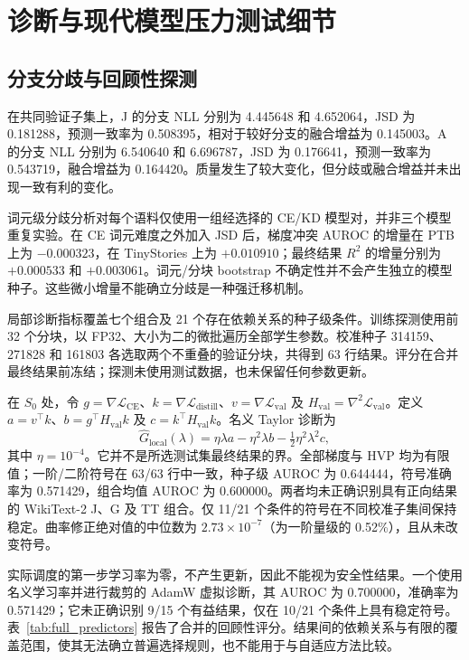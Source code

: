 \section{诊断与现代模型压力测试细节}\label{app:diagnostics-modern}

\subsection{分支分歧与回顾性探测}
在共同验证子集上，J 的分支 NLL 分别为 4.445648 和 4.652064，JSD 为 0.181288，预测一致率为 0.508395，相对于较好分支的融合增益为 0.145003。A 的分支 NLL 分别为 6.540640 和 6.696787，JSD 为 0.176641，预测一致率为 0.543719，融合增益为 0.164420。质量发生了较大变化，但分歧或融合增益并未出现一致有利的变化。

词元级分歧分析对每个语料仅使用一组经选择的 CE/KD 模型对，并非三个模型重复实验。在 CE 词元难度之外加入 JSD 后，梯度冲突 AUROC 的增量在 PTB 上为 $-0.000323$，在 TinyStories 上为 $+0.010910$；最终结果 $R^2$ 的增量分别为 $+0.000533$ 和 $+0.003061$。词元/分块 bootstrap 不确定性并不会产生独立的模型种子。这些微小增量不能确立分歧是一种强迁移机制。

局部诊断指标覆盖七个组合及 21 个存在依赖关系的种子级条件。训练探测使用前 32 个分块，以 FP32、大小为二的微批遍历全部学生参数。校准种子 314159、271828 和 161803 各选取两个不重叠的验证分块，共得到 63 行结果。评分在合并最终结果前冻结；探测未使用测试数据，也未保留任何参数更新。

在 $S_0$ 处，令 $g=\nabla\mathcal L_{\mathrm{CE}}$、$k=\nabla\mathcal L_{\mathrm{distill}}$、$v=\nabla\mathcal L_{\mathrm{val}}$ 及 $H_{\mathrm{val}}=\nabla^2\mathcal L_{\mathrm{val}}$。定义 $a=v^\top k$、$b=g^\top H_{\mathrm{val}}k$ 及 $c=k^\top H_{\mathrm{val}}k$。名义 Taylor 诊断为
\begin{equation}
\widehat G_{\mathrm{local}}(\lambda)=\eta\lambda a-\eta^2\lambda b-\tfrac12\eta^2\lambda^2c,
\end{equation}
其中 $\eta=10^{-4}$。它并不是所选测试集最终结果的界。全部梯度与 HVP 均为有限值；一阶/二阶符号在 63/63 行中一致，种子级 AUROC 为 0.644444，符号准确率为 0.571429，组合均值 AUROC 为 0.600000。两者均未正确识别具有正向结果的 WikiText-2 J、G 及 TT 组合。仅 11/21 个条件的符号在不同校准子集间保持稳定。曲率修正绝对值的中位数为 $2.73\times10^{-7}$（为一阶量级的 0.52\%），且从未改变符号。

实际调度的第一步学习率为零，不产生更新，因此不能视为安全性结果。一个使用名义学习率并进行裁剪的 AdamW 虚拟诊断，其 AUROC 为 0.700000，准确率为 0.571429；它未正确识别 9/15 个有益结果，仅在 10/21 个条件上具有稳定符号。表~\ref{tab:full_predictors} 报告了合并的回顾性评分。结果间的依赖关系与有限的覆盖范围，使其无法确立普遍选择规则，也不能用于与自适应方法比较。


